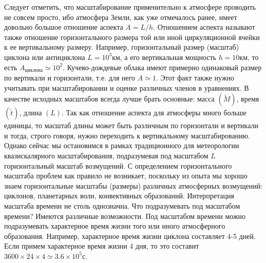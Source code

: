 Следует отметить, что масштабирование применительно к атмосфере проводить не совсем просто, ибо атмосфера Земли, как уже отмечалось ранее, имеет довольно большое отношение аспекта $A=L/h$. Отношением аспекта называют также отношение горизонтального размера той или иной циркуляционной ячейки к ее вертикальному размеру. Например, горизонтальный размер (масштаб) циклона или антициклона $L=10^3$км, а его вертикальная мощность $h = 10$км, то есть $A_{циклона}  \simeq 10^2$. Кучево-дождевые облака имеют примерно одинаковый размер по вертикали и горизонтали, т.е. для него $A \simeq 1$. Этот факт также нужно учитывать при масштабировании и оценке различных членов в уравнениях. В качестве исходных масштабов всегда лучше брать основные: масса $(\tilde{M})$, время $(\tilde{t})$, длина $(L)$. Так как отношение аспекта для атмосферы много больше единицы, то масштаб длины может быть различным по горизонтали и вертикали и тогда, строго говоря, нужно переходить к вертикальному масштабированию. Однако сейчас мы остановимся в рамках традиционного для метеорологии квазискалярного масштабирования, подразумевая под масштабом $L$ горизонтальный масштаб возмущений. С определением горизонтального масштаба проблем как правило не возникает, поскольку из опыта мы хорошо знаем горизонтальные масштабы (размеры) различных атмосферных возмущений: циклонов, планетарных волн, конвективных образований. Интерпретация масштаба времени не столь однозначна. Что подразумевать под масштабом времени? Имеются различные возможности. Под масштабом времени можно  подразумевать характерное время жизни того или иного атмосферного образования. Например, характерное время жизни циклона составляет 4-5 дней. Если примем характерное время жизни 4 дня, то это составит $3600\times24\times4\simeq3.6\times10^5$с. 

